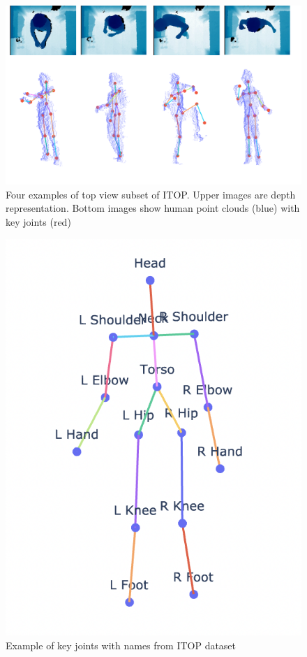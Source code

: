 \begin{figure}[htbp]
    \centerline{\includegraphics[scale=.15]{Figures/dataset examples - top view.png}}
    \caption{Four examples of top view subset of ITOP. Upper images are depth representation. Bottom images show human point clouds (blue) with key joints (red)}
    \label{img:dataset-human-examples-top-view}
\end{figure}

\begin{figure}[htbp]
    \centerline{\includegraphics[scale=0.8]{Figures/dataset-example-joints.png}}
    \caption{Example of key joints with names from ITOP dataset}
    \label{img:dataset-example-joints}
\end{figure}

